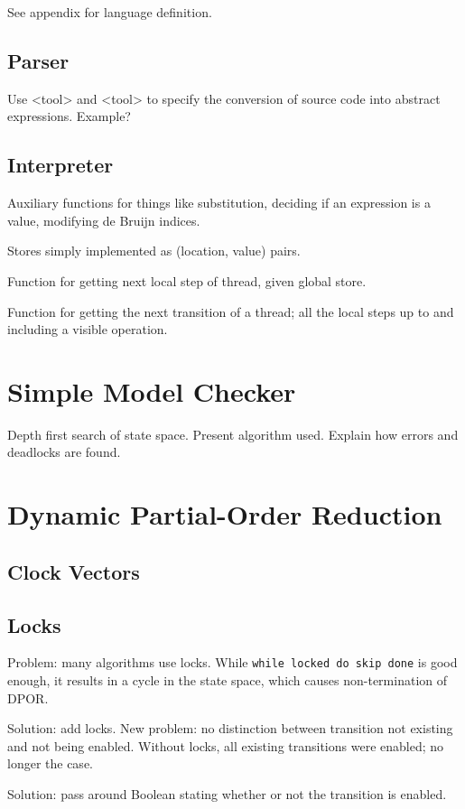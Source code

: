 \documentclass[12pt,a4paper,twoside,openright]{report}
\begin{document}
See appendix for language definition.

\subsection{Parser}
Use <tool> and <tool> to specify the conversion of source code
into abstract expressions. Example?

\subsection{Interpreter}
Auxiliary functions for things like substitution, deciding if
an expression is a value, modifying de Bruijn indices.

Stores simply implemented as (location, value) pairs.

Function for getting next local step of thread, given global store.

Function for getting the next transition of a thread; all the local
steps up to and including a visible operation.

\section{Simple Model Checker}

Depth first search of state space. Present algorithm used.
Explain how errors and deadlocks are found.

\section{Dynamic Partial-Order Reduction}

\subsection{Clock Vectors}
\subsection{Locks}
Problem: many algorithms use locks. While \texttt{while locked do skip done}
is good enough, it results in a cycle in the state space, which causes
non-termination of DPOR.

Solution: add locks. New problem: no distinction between
transition not existing and not being enabled. Without
locks, all existing transitions were enabled; no longer
the case.

Solution: pass around Boolean stating whether or not the transition
is enabled.
\end{document}
